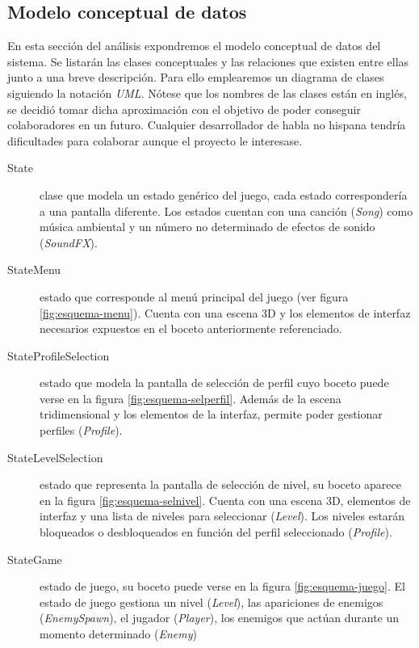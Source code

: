 \subsection{Modelo conceptual de datos}

En esta sección del análisis expondremos el modelo conceptual de datos
del sistema. Se listarán las clases conceptuales y las relaciones que
existen entre ellas junto a una breve descripción. Para ello emplearemos
un diagrama de clases siguiendo
la notación \textit{UML}. Nótese que los nombres de las clases están en inglés,
se decidió tomar dicha aproximación con el objetivo de poder conseguir
colaboradores en un futuro. Cualquier desarrollador de habla no hispana
tendría dificultades para colaborar aunque el proyecto le interesase.\\

\begin{description}
    \item [State] clase que modela un estado genérico del juego, cada estado
    correspondería a una pantalla diferente. Los estados cuentan con una
    canción (\textit{Song}) como música ambiental y un número no determinado de efectos
    de sonido (\textit{SoundFX}). 
    \item [StateMenu] estado que corresponde al menú principal del juego
    (ver figura \ref{fig:esquema-menu}). Cuenta con una escena 3D y los
    elementos de interfaz    necesarios expuestos en el boceto anteriormente
    referenciado.
    \item [StateProfileSelection] estado que modela la pantalla de selección
    de perfil cuyo boceto puede verse en la figura \ref{fig:esquema-selperfil}.
    Además de la escena tridimensional y los elementos de la interfaz, permite
    poder gestionar perfiles (\textit{Profile}).
    \item [StateLevelSelection] estado que representa la pantalla de selección
    de nivel, su boceto aparece en la figura \ref{fig:esquema-selnivel}.
    Cuenta con una escena 3D, elementos de interfaz y una lista de niveles
    para seleccionar (\textit{Level}). Los niveles estarán bloqueados o
    desbloqueados en función del perfil seleccionado (\textit{Profile}).
    \item [StateGame] estado de juego, su boceto puede verse en la figura
    \ref{fig:esquema-juego}. El estado de juego gestiona un nivel (\textit{Level}),
    las apariciones de enemigos (\textit{EnemySpawn}), el jugador (\textit{Player}),
    los enemigos que actúan durante un momento determinado (\textit{Enemy})

\end{description}
